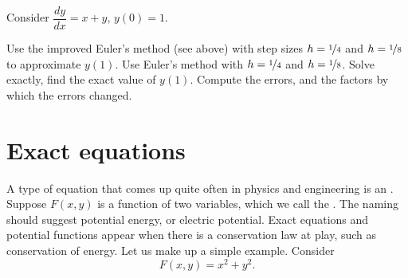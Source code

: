 \begin{exercise}
Consider $\dfrac{dy}{dx} = x+y$, $y(0)=1$.
\begin{tasks}
\task Use the improved Euler's method (see above) with step sizes $h=\nicefrac{1}{4}$ and $h=\nicefrac{1}{8}$
to approximate $y(1)$.
\task Use Euler's method with
$h=\nicefrac{1}{4}$ and $h=\nicefrac{1}{8}$.
\task Solve exactly, find the exact value of
$y(1)$.
\task Compute the errors, and the factors by which the errors changed.
\end{tasks}
\end{exercise}


\sectionnewpage
\section{Exact equations}
\label{exact:section}



A type of equation that comes up quite often in physics and
engineering is an
\emph{}.
Suppose $F(x,y)$ is a function of two variables, which we call the
\emph{}.  The naming should suggest 
potential energy, or electric potential.  Exact equations and potential
functions appear when there is a conservation law at play, such as 
conservation of energy.
Let us make up a simple example.  Consider
\begin{equation*}
F(x,y) = x^2+y^2 .
\end{equation*}

